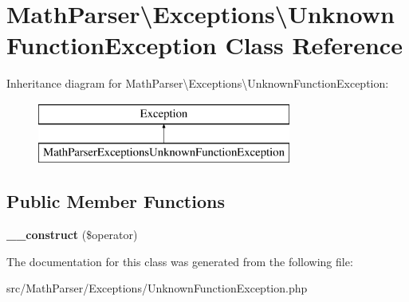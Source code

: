 \hypertarget{classMathParser_1_1Exceptions_1_1UnknownFunctionException}{\section{Math\-Parser\textbackslash{}Exceptions\textbackslash{}Unknown\-Function\-Exception Class Reference}
\label{classMathParser_1_1Exceptions_1_1UnknownFunctionException}
}
Inheritance diagram for Math\-Parser\textbackslash{}Exceptions\textbackslash{}Unknown\-Function\-Exception\-:\begin{figure}[H]
\begin{center}
\leavevmode
\includegraphics[height=2.000000cm]{classMathParser_1_1Exceptions_1_1UnknownFunctionException}
\end{center}
\end{figure}
\subsection*{Public Member Functions}
\begin{DoxyCompactItemize}
\item 
\hypertarget{classMathParser_1_1Exceptions_1_1UnknownFunctionException_a0bfd13e9eb4aa4b48248917fc5dad3c4}{{\bfseries \-\_\-\-\_\-construct} (\$operator)}\label{classMathParser_1_1Exceptions_1_1UnknownFunctionException_a0bfd13e9eb4aa4b48248917fc5dad3c4}

\end{DoxyCompactItemize}


The documentation for this class was generated from the following file\-:\begin{DoxyCompactItemize}
\item 
src/\-Math\-Parser/\-Exceptions/Unknown\-Function\-Exception.\-php\end{DoxyCompactItemize}
